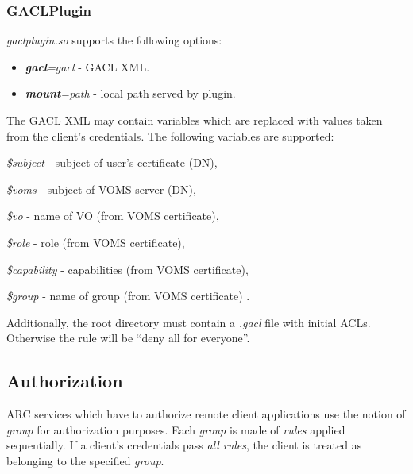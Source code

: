 \documentclass{article}
\begin{document}
\subsubsection{GACLPlugin}

\textit{gaclplugin.so} supports the following options:

\begin{itemize}
\item \textbf{\textit{gacl}}\textit{=gacl} - GACL XML.
\item \textbf{\textit{mount}}\textit{=path} - local path served by
plugin.
\end{itemize}

The GACL XML may contain variables which are replaced with values taken from
the client's credentials. The following variables are supported:

\begin{list}{--}{\setlength{\labelwidth}{0.5cm}\setlength{\rightmargin}{\leftmargin}}
\item [{\emph{\$subject}}] - subject of user's certificate (DN),
\item [{\emph{\$voms}}] - subject of VOMS\cite{voms} server (DN),
\item [{\emph{\$vo}}] - name of VO (from VOMS certificate),
\item [{\emph{\$role}}] - role (from VOMS certificate),
\item [{\emph{\$capability}}] - capabilities (from VOMS certificate),
\item [{\emph{\$group}}] - name of group (from VOMS certificate) .
\end{list}
Additionally, the root directory must contain a \emph{.gacl} file with initial
ACLs. Otherwise the rule will be {}``deny all for everyone''.


\subsection{Authorization}
\label{sec:Authorization}


ARC services which have to authorize remote client applications use
the notion of \textit{group} for authorization purposes. Each
\textit{group} is made of \textit{rules} applied sequentially. If a
client's credentials pass \textit{all rules}, the client is treated as
belonging to the specified \textit{group}.
\end{document}
